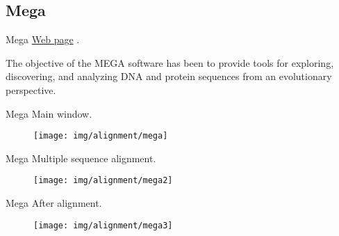 \documentclass[10pt]{beamer}
\newcommand{\chref}[2]{	\href{#1}{{\usebeamercolor[bg]{Feather}#2}} }
\newcommand{\chref}[2]{	\href{#1}{{\color{blue}#2}}}
\newcommand{\1}{
	\setbeamertemplate{background}{
		\texttt{[image: img/1]}
		\tikz[overlay] \fill[fill opacity=0.75,fill=white] (0,0) rectangle (-\paperwidth,\paperheight);
	}
}
\begin{document}
\subsection{Mega}

\begin{frame}[fragile]{Mega}{}
	\chref{https://www.megasoftware.net/}{Web page}.
	\begin{block}{}
		The objective of the MEGA software has been to provide tools for exploring, discovering, and analyzing DNA and protein sequences from an evolutionary perspective. 
	\end{block}
\end{frame}


\begin{frame}[fragile]{Mega}{}
	Main window.
	\begin{figure}
		\texttt{[image: img/alignment/mega]}
	\end{figure}
\end{frame}

\begin{frame}[fragile]{Mega}{}
	Multiple sequence alignment.
	\begin{figure}
		\texttt{[image: img/alignment/mega2]}
	\end{figure}
\end{frame}

\begin{frame}[fragile]{Mega}{}
	After alignment.
	\begin{figure}
		\texttt{[image: img/alignment/mega3]}
	\end{figure}
\end{frame}
\end{document}
